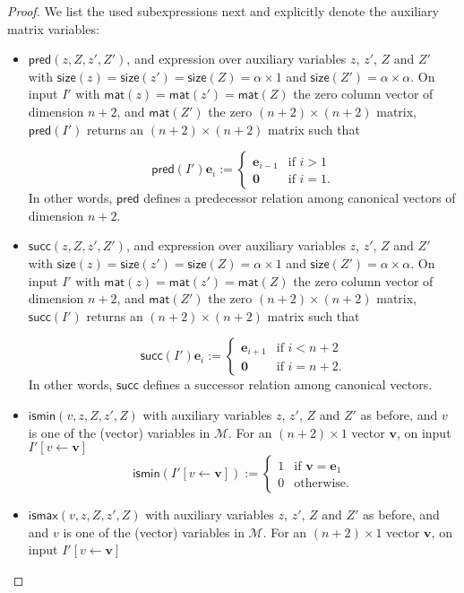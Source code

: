 \begin{proof}
We list the used subexpressions next and explicitly denote the auxiliary matrix variables:
\begin{itemize}
	\item $\mathsf{pred}(z,Z,z',Z')$, and expression over auxiliary variables $z$, $z'$, $Z$ and $Z'$ with $\mathsf{size}(z)=\mathsf{size}(z')=\mathsf{size}(Z)=\alpha\times 1$ and $\mathsf{size}(Z')=\alpha\times\alpha$. On input $I'$ with 
	$\mathsf{mat}(z)=\mathsf{mat}(z')=\mathsf{mat}(Z)$ the zero column vector of dimension $n+2$, and $\mathsf{mat}(Z')$ the zero $(n+2)\times (n+2)$ matrix,
	 $\mathsf{pred}(I')$ returns an $(n+2)\times (n+2)$ matrix such that 
	 
	 $$\mathsf{pred}(I')\mathbf{e}_i:=\begin{cases} 
	 \mathbf{e}_{i-1} & \text{if $i>1$}\\
	 \mathbf{0} & \text{if $i=1$}.
	\end{cases}
	$$
	In other words, $\mathsf{pred}$ defines a predecessor relation among canonical vectors of dimension $n+2$.
	 \item $\mathsf{succ}(z,Z,z',Z')$, and expression over auxiliary variables $z$, $z'$, $Z$ and $Z'$ with $\mathsf{size}(z)=\mathsf{size}(z')=\mathsf{size}(Z)=\alpha\times 1$ and $\mathsf{size}(Z')=\alpha\times\alpha$. On input $I'$ with 
	$\mathsf{mat}(z)=\mathsf{mat}(z')=\mathsf{mat}(Z)$ the zero column vector of dimension $n+2$, and $\mathsf{mat}(Z')$ the zero $(n+2)\times (n+2)$ matrix,
	 $\mathsf{succ}(I')$ returns an $(n+2)\times (n+2)$ matrix such that 
	 
	 $$\mathsf{succ}(I')\mathbf{e}_i:=\begin{cases} 
	 \mathbf{e}_{i+1} & \text{if $i<n+2$}\\
	 \mathbf{0} & \text{if $i=n+2$}.
	\end{cases}
	$$
	In other words, $\mathsf{succ}$ defines a successor relation among canonical vectors.
	\item $\textsf{ismin}(v,z,Z,z',Z)$ with auxiliary variables $z$, $z'$, $Z$ and $Z'$ as before, and $v$ is one of the (vector) variables in $\mathcal{M}$. For an $(n+2)\times 1$ vector $\mathbf{v}$, on input $I'[v\gets \mathbf{v}]$	$$\mathsf{ismin}(I'[v\gets\mathbf{v}]):=\begin{cases} 1 & \text{if $\mathbf{v}=\mathbf{e}_1$}\\
		0 & \text{otherwise}.
		\end{cases}$$
	\item $\textsf{ismax}(v,z,Z,z',Z)$ with auxiliary variables $z$, $z'$, $Z$ and $Z'$ as before, and 
	and $v$ is one of the (vector) variables in $\mathcal{M}$. For an $(n+2)\times 1$ vector $\mathbf{v}$, on input $I'[v\gets \mathbf{v}]$
	

\end{itemize}
\end{proof}
